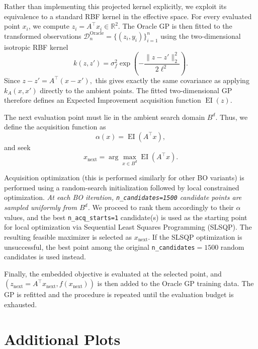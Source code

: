 \documentclass[10pt]{article}
\begin{document}
Rather than implementing this projected kernel explicitly, we exploit its
equivalence to a standard RBF kernel in the effective space. For every
evaluated point $x_i$, we compute
$
z_i=A^\top x_i\in\mathbb{R}^2.
$
The Oracle GP is then fitted to the transformed observations
$
\mathcal D_n^{\mathrm{Oracle}}
=
\{(z_i,y_i)\}_{i=1}^n
$
using the two-dimensional isotropic RBF kernel
\[
k(z,z')
=
\sigma_f^2
\exp\left(
-\frac{\|z-z'\|_2^2}{2\ell^2}
\right).
\]
Since
$
z-z'=A^\top(x-x'),
$
this gives exactly the same covariance as applying $k_A(x,x')$ directly
to the ambient points. The fitted two-dimensional GP therefore defines
an Expected Improvement acquisition function $\operatorname{EI}(z)$.

The next evaluation point must lie in the ambient
search domain $B^d$. Thus, we define the acquisition function as
\[
\alpha(x)
=
\operatorname{EI}(A^\top x),
\]
and seek
\[
x_{\mathrm{next}}
=
\arg\max_{x\in B^d}
\operatorname{EI}(A^\top x).
\]

Acquisition optimization (this is performed similarly for other BO variants) is performed using a random-search
initialization followed by local constrained optimization. \textit{At each BO
iteration, \newline \texttt{n\_candidates=1500} candidate points are sampled
uniformly from $B^d$.} We proceed to rank them accordingly to their $\alpha$ values, and the best
\texttt{n\_acq\_starts=1} candidate(s) is used as the starting point for
local optimization via Sequential Least Squares Programming (SLSQP).  The
resulting feasible maximizer is selected as $x_{\mathrm{next}}$. If the
SLSQP optimization is unsuccessful, the best point among the original
\texttt{n\_candidates}$=1500$ random candidates is used instead.

Finally, the embedded objective is evaluated at the selected point, and 
$
\left(z_\mathrm{next}=A^\top x_{\mathrm{next}},f(x_\mathrm{next})\right)
$
is then added to the Oracle GP training data. The GP is refitted and the
procedure is repeated until the evaluation budget is exhausted.



\FloatBarrier
\section{Additional Plots}
\end{document}

